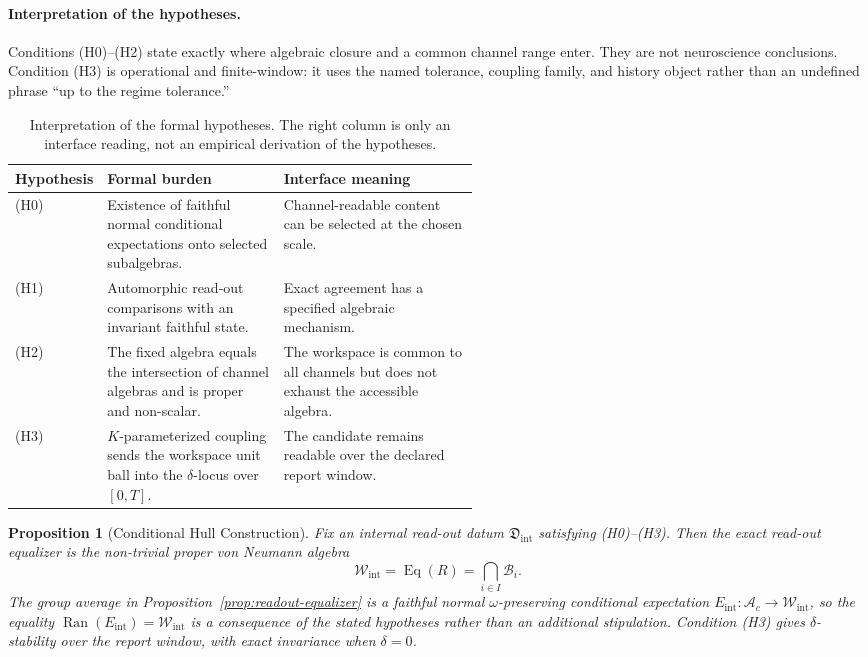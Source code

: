\documentclass[12pt]{article}
\newtheorem{proposition}{Proposition}[section]
\theoremstyle{definition}
\theoremstyle{remark}
\newcommand{\Ac}{\mathcal A_c}
\newcommand{\Wint}{\mathcal W_{\mathrm{int}}}
\begin{document}
\paragraph{Interpretation of the hypotheses.}
Conditions (H0)--(H2) state exactly where algebraic closure and a common
channel range enter. They are not neuroscience conclusions. Condition
(H3) is operational and finite-window: it uses the named tolerance,
coupling family, and history object rather than an undefined phrase
``up to the regime tolerance.''

\begin{table}[H]
\centering
\small
\begin{tabularx}{0.98\linewidth}{P{0.16\linewidth}P{0.38\linewidth}Y}
\toprule
\textbf{Hypothesis} & \textbf{Formal burden} & \textbf{Interface meaning} \\
\midrule
(H0) &
Existence of faithful normal conditional expectations onto selected subalgebras. &
Channel-readable content can be selected at the chosen scale. \\
(H1) &
Automorphic read-out comparisons with an invariant faithful state. &
Exact agreement has a specified algebraic mechanism. \\
(H2) &
The fixed algebra equals the intersection of channel algebras and is proper and non-scalar. &
The workspace is common to all channels but does not exhaust the accessible algebra. \\
(H3) &
\(K\)-parameterized coupling sends the workspace unit ball into the \(\delta\)-locus over \([0,T]\). &
The candidate remains readable over the declared report window. \\
\bottomrule
\end{tabularx}
\caption{Interpretation of the formal hypotheses. The right column is
only an interface reading, not an empirical derivation of the
hypotheses.}
\end{table}

\begin{proposition}[Conditional Hull Construction]
\label{prop:hull-construction-main}
Fix an internal read-out datum \(\mathfrak D_{\mathrm{int}}\) satisfying
(H0)--(H3). Then the exact read-out equalizer is the non-trivial proper
von Neumann algebra
\[
\Wint=\operatorname{Eq}(R)=\bigcap_{i\in I}\mathcal B_i.
\]
The group average in Proposition~\ref{prop:readout-equalizer} is a
faithful normal \(\omega\)-preserving conditional expectation
\(E_{\mathrm{int}}:\Ac\to\Wint\), so the equality
\(\operatorname{Ran}(E_{\mathrm{int}})=\Wint\) is a consequence of the
stated hypotheses rather than an additional stipulation. Condition (H3)
gives \(\delta\)-stability over the report window, with exact invariance
when \(\delta=0\).
\end{proposition}
\end{document}
